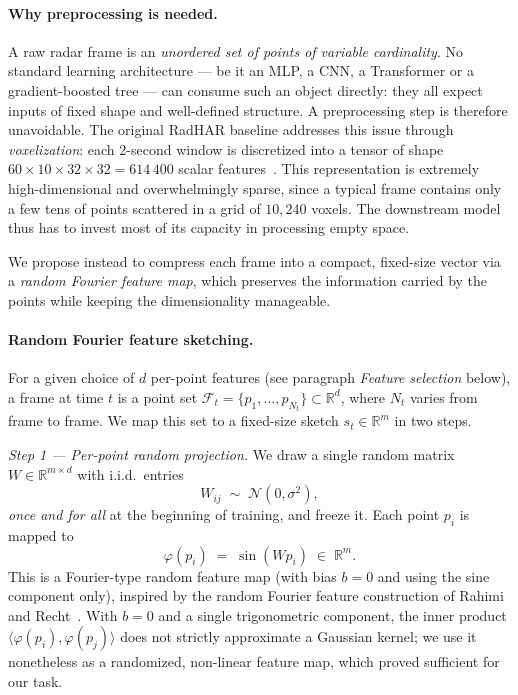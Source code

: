\documentclass[10pt,twocolumn]{article}
\begin{document}
\paragraph{Why preprocessing is needed.}
A raw radar frame is an \emph{unordered set of points of variable
cardinality}. No standard learning architecture --- be it an MLP, a CNN,
a Transformer or a gradient-boosted tree --- can consume such an object
directly: they all expect inputs of fixed shape and well-defined
structure. A preprocessing step is therefore unavoidable. The original
RadHAR baseline addresses this issue through \emph{voxelization}: each
2-second window is discretized into a tensor of shape
$60 \times 10 \times 32 \times 32 = 614\,400$ scalar
features~\cite{singh2019radhar}. This representation is extremely
high-dimensional and overwhelmingly sparse, since a typical frame
contains only a few tens of points scattered in a grid of $10{,}240$
voxels. The downstream model thus has to invest most of its capacity in
processing empty space.

We propose instead to compress each frame into a compact, fixed-size
vector via a \emph{random Fourier feature map}, which preserves the
information carried by the points while keeping the dimensionality
manageable.

\paragraph{Random Fourier feature sketching.}
For a given choice of $d$ per-point features
(see paragraph \emph{Feature selection} below), a frame at time $t$ is
a point set $\mathcal{F}_t = \{p_1, \ldots, p_{N_t}\} \subset
\mathbb{R}^d$, where $N_t$ varies from frame to frame. We map this set
to a fixed-size sketch $s_t \in \mathbb{R}^m$ in two steps.

\emph{Step 1 --- Per-point random projection.} We draw a single random
matrix $W \in \mathbb{R}^{m \times d}$ with i.i.d.\ entries
\[
W_{ij} \;\sim\; \mathcal{N}(0, \sigma^2),
\]
\emph{once and for all} at the beginning of training, and freeze it.
Each point $p_i$ is mapped to
\[
\varphi(p_i) \;=\; \sin(W p_i) \;\in\; \mathbb{R}^{m}.
\]
This is a Fourier-type random feature map (with bias $b = 0$ and using
the sine component only), inspired by the random Fourier feature
construction of Rahimi and Recht~\cite{rahimi2007random}. With
$b = 0$ and a single trigonometric component, the inner product
$\langle \varphi(p_i), \varphi(p_j)\rangle$ does not strictly
approximate a Gaussian kernel; we use it nonetheless as a randomized,
non-linear feature map, which proved sufficient for our task.
\end{document}
